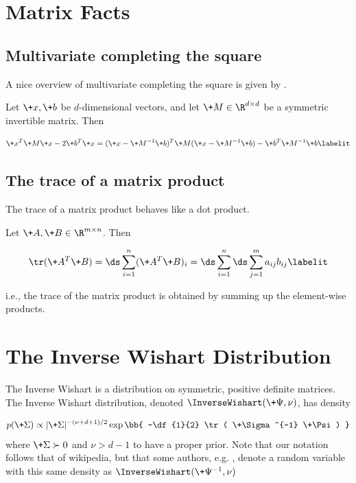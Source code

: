 \documentclass{article} %
\begin{document}
\section{Matrix Facts}

\subsection{Multivariate completing the square}

A nice overview of multivariate completing the square is given by \cite{gundersenXXXXcompleting}.    

Let $\+x,  \+b$ be $d$-dimensional vectors, and let $\+M \in \R^{d \times d}$ be a symmetric invertible matrix. Then

\begin{align*}
\+x^T \+M \+x - 2 \+b^T \+x = (\+x - \+M^{-1} \+b)^T \+M (\+x - \+M^{-1} \+b) - \+b^T \+M^{-1} \+b
 \labelit \label{eqn:multivariate_completing_the_square}
\end{align*}

% 

\subsection{The trace of a matrix product}

The trace of a matrix product behaves like a dot product.  

Let $\+A, \+B \in \R^{m \times n}$.  Then 

\begin{align*}
\tr (\+A^T \+B) = \ds\sum_{i=1}^n (\+A^T \+B)_i = \ds\sum_{i=1}^n \ds\sum_{j=1}^m a_{ij} b_{ij}
\labelit \label{eqn:trace_of_matrix_product}
\end{align*}

i.e.,  the trace of the matrix product is obtained by summing up the element-wise products. 


\section{The Inverse Wishart Distribution} \label{sec:inverse_wishart_distribution}
 
The Inverse Wishart is a distribution on symmetric,  positive definite matrices.     The Inverse Wishart distribution,  denoted $\InverseWishart(\+\Psi, \nu)$,  has density

\begin{align}
p(\+\Sigma) \propto | \+\Sigma|^{-(\nu+d +1) /2}  \exp \bb{ -\df{1}{2} \tr ( \+\Sigma^{-1} \+\Psi) } 
\label{eqn:inverse_wishart_density}
\end{align}
where $\+\Sigma \succ 0$ and $\nu > d-1$ to have a proper prior.     Note that our notation follows that of wikipedia,  but that some authors, e.g.  \cite{hoff2009first},  denote a random variable with this same density as  $\InverseWishart(\+\Psi^{-1},  \nu)$
\end{document}
